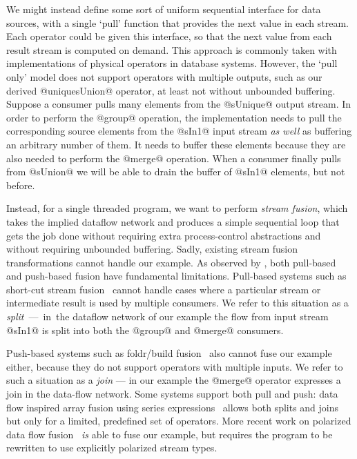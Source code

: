 We might instead define some sort of uniform sequential interface for data sources, with a single `pull' function that provides the next value in each stream. Each operator could be given this interface, so that the next value from each result stream is computed on demand. This approach is commonly taken with implementations of physical operators in database systems. However, the `pull only' model does not support operators with multiple outputs, such as our derived @uniquesUnion@ operator, at least not without unbounded buffering. Suppose a consumer pulls many elements from the @sUnique@ output stream. In order to perform the @group@ operation, the implementation needs to pull the corresponding source elements from the @sIn1@ input stream \emph{as well} as buffering an arbitrary number of them. It needs to buffer these elements because they are also needed to perform the @merge@ operation. When a consumer finally pulls from @sUnion@ we will be able to drain the buffer of @sIn1@ elements, but not before.

Instead, for a single threaded program, we want to perform \emph{stream fusion}, which takes the implied dataflow network and produces a simple sequential loop that gets the job done without requiring extra process-control abstractions and without requiring unbounded buffering. Sadly, existing stream fusion transformations cannot handle our example. As observed by \citet{kay2009you}, both pull-based and push-based fusion have fundamental limitations. Pull-based systems such as short-cut stream fusion~\cite{coutts2007stream} cannot handle cases where a particular stream or intermediate result is used by multiple consumers. We refer to this situation as a \mbox{\emph{split} --- in the} dataflow network of our example the flow from input stream @sIn1@ is split into both the @group@ and @merge@ consumers. 

Push-based systems such as foldr/build fusion~\cite{gill1993short} also cannot fuse our example either, because they do not support operators with multiple inputs. We refer to such a situation as a \emph{join} --- in our example the @merge@ operator expresses a join in the data-flow network. Some systems support both pull and push: data flow inspired array fusion using series expressions~\cite{lippmeier2013data} allows both splits and joins but only for a limited, predefined set of operators. More recent work on polarized data flow fusion~\cite{lippmeier2016polarized} \emph{is} able to fuse our example, but requires the program to be rewritten to use explicitly polarized stream types. 

